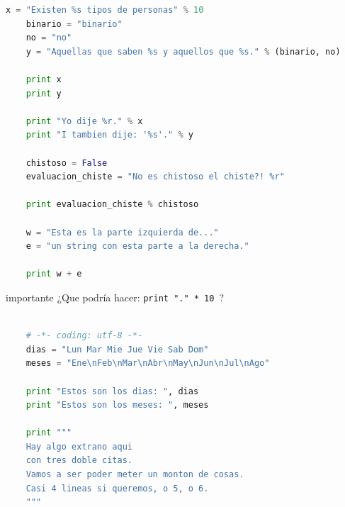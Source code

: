 \documentclass[]{beamer}
\begin{document}
\begin{frame}
	\begin{lstlisting}[language=Python, 
	basicstyle=\ttfamily\small, 
	keywordstyle=\color{keywords},
	commentstyle=\color{comments},
	stringstyle=\color{red},
	showstringspaces=false,
	identifierstyle=\color{green},caption= Conversación con un Programador, basicstyle=\tiny]
	x = "Existen %s tipos de personas" % 10
	binario = "binario"
	no = "no"
	y = "Aquellas que saben %s y aquellos que %s." % (binario, no)

	print x
	print y

	print "Yo dije %r." % x
	print "I tambien dije: '%s'." % y

	chistoso = False
	evaluacion_chiste = "No es chistoso el chiste?! %r"

	print evaluacion_chiste % chistoso

	w = "Esta es la parte izquierda de..."
	e = "un string con esta parte a la derecha."

	print w + e
	\end{lstlisting}
	\begin{block}{importante}
		¿Que podría hacer: \verb|print "." * 10 |?
	\end{block}
\end{frame}

\begin{frame}[fragile]
	\begin{lstlisting}[language=Python, 
	basicstyle=\ttfamily\small, 
	keywordstyle=\color{keywords},
	commentstyle=\color{comments},
	stringstyle=\color{red},
	showstringspaces=false,
	identifierstyle=\color{green},caption= Dias de la semana, basicstyle=\tiny]
	
	# -*- coding: utf-8 -*-
	dias = "Lun Mar Mie Jue Vie Sab Dom"
	meses = "Ene\nFeb\nMar\nAbr\nMay\nJun\nJul\nAgo"
	
	print "Estos son los dias: ", dias
	print "Estos son los meses: ", meses
	
	print """
	Hay algo extrano aqui
	con tres doble citas.
	Vamos a ser poder meter un monton de cosas.
	Casi 4 lineas si queremos, o 5, o 6.
	"""
	\end{lstlisting}
\end{frame}
\end{document}
